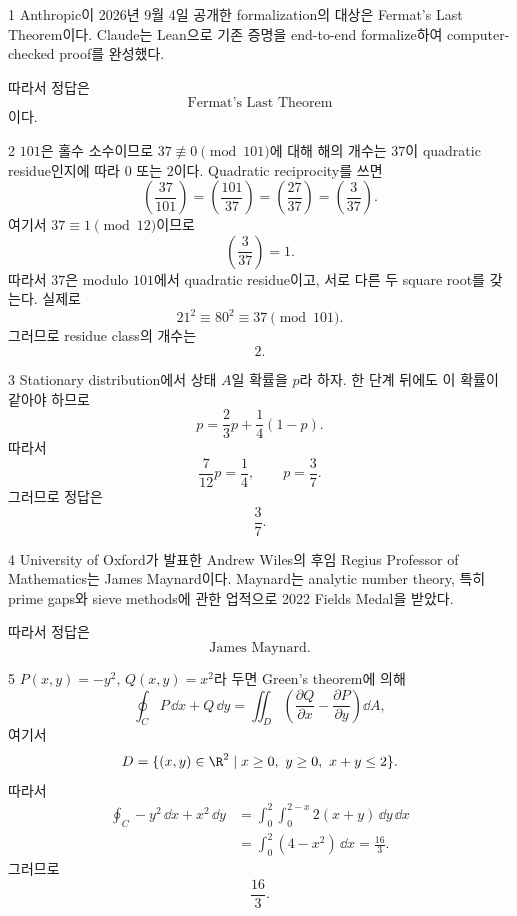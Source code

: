 \documentclass[11pt,oneside]{article}
\begin{document}

\begin{problemsolution}{1}
Anthropic이 2026년 9월 4일 공개한 formalization의 대상은 Fermat's Last Theorem이다. Claude는 Lean으로 기존 증명을 end-to-end formalize하여 computer-checked proof를 완성했다.

따라서 정답은
\[
    \boxed{\text{Fermat's Last Theorem}}
\]
이다.
\end{problemsolution}

\begin{problemsolution}{2}
$101$은 홀수 소수이므로 $37\not\equiv0\pmod{101}$에 대해 해의 개수는 $37$이 quadratic residue인지에 따라 $0$ 또는 $2$이다. Quadratic reciprocity를 쓰면
\[
    \left(\frac{37}{101}\right)
    =
    \left(\frac{101}{37}\right)
    =
    \left(\frac{27}{37}\right)
    =
    \left(\frac{3}{37}\right).
\]
여기서 $37\equiv1\pmod{12}$이므로
\[
    \left(\frac{3}{37}\right)=1.
\]
따라서 $37$은 modulo $101$에서 quadratic residue이고, 서로 다른 두 square root를 갖는다. 실제로
\[
    21^2\equiv80^2\equiv37\pmod{101}.
\]
그러므로 residue class의 개수는
\[
    \boxed{2}.
\]
\end{problemsolution}

\begin{problemsolution}{3}
Stationary distribution에서 상태 $A$일 확률을 $p$라 하자. 한 단계 뒤에도 이 확률이 같아야 하므로
\[
    p
    =
    \frac23p+\frac14(1-p).
\]
따라서
\[
    \frac{7}{12}p=\frac14,
    \qquad
    p=\frac37.
\]
그러므로 정답은
\[
    \boxed{\frac37}.
\]
\end{problemsolution}

\begin{problemsolution}{4}
University of Oxford가 발표한 Andrew Wiles의 후임 Regius Professor of Mathematics는 James Maynard이다. Maynard는 analytic number theory, 특히 prime gaps와 sieve methods에 관한 업적으로 2022 Fields Medal을 받았다.

따라서 정답은
\[
    \boxed{\text{James Maynard}}.
\]
\end{problemsolution}

\begin{problemsolution}{5}
$P(x,y)=-y^2$, $Q(x,y)=x^2$라 두면 Green's theorem에 의해
\[
    \oint_C P\,\dd x+Q\,\dd y
    =
    \iint_D
    \left(
        \frac{\partial Q}{\partial x}
        -
        \frac{\partial P}{\partial y}
    \right)
    \dd A,
\]
여기서
\[
    D=\{(x,y)\in\R^2\mid x\geq0,\ y\geq0,\ x+y\leq2\}.
\]
따라서
\[
    \begin{aligned}
    \oint_C -y^2\,\dd x+x^2\,\dd y
    &=
    \int_0^2\int_0^{2-x}2(x+y)\,\dd y\,\dd x\\
    &=
    \int_0^2(4-x^2)\,\dd x
    =\frac{16}{3}.
    \end{aligned}
\]
그러므로
\[
    \boxed{\frac{16}{3}}.
\]
\end{problemsolution}
\end{document}
